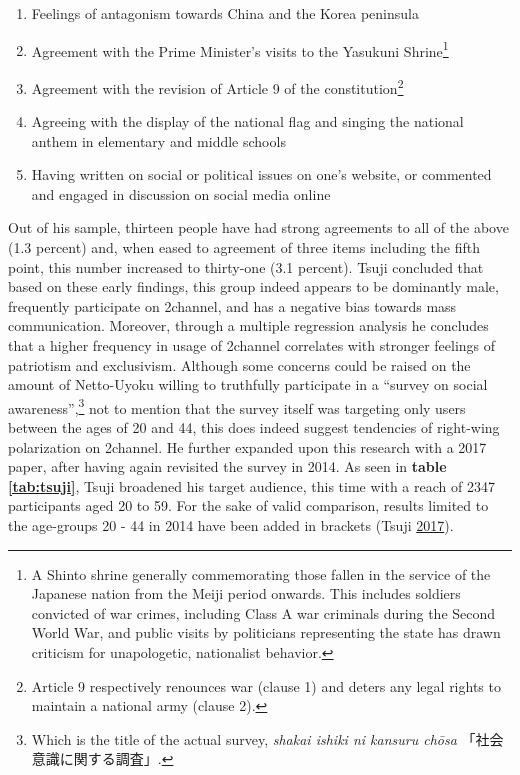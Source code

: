 \documentclass[10pt,british,A4paper,twoside]{memoir}
\providecommand{\tightlist}{%
  \setlength{\itemsep}{0pt}\setlength{\parskip}{0pt}}
\begin{document}
\begin{enumerate}
\def\labelenumi{\arabic{enumi}.}
\tightlist
\item
  Feelings of antagonism towards China and the Korea peninsula
\item
  Agreement with the Prime Minister's visits to the Yasukuni
  Shrine\footnote{A Shinto shrine generally commemorating those fallen
    in the service of the Japanese nation from the Meiji period onwards.
    This includes soldiers convicted of war crimes, including Class A
    war criminals during the Second World War, and public visits by
    politicians representing the state has drawn criticism for
    unapologetic, nationalist behavior.}
\item
  Agreement with the revision of Article 9 of the constitution\footnote{Article
    9 respectively renounces war (clause 1) and deters any legal rights
    to maintain a national army (clause 2).}
\item
  Agreeing with the display of the national flag and singing the
  national anthem in elementary and middle schools
\item
  Having written on social or political issues on one's website, or
  commented and engaged in discussion on social media online
\end{enumerate}

Out of his sample, thirteen people have had strong agreements to all of
the above (1.3 percent) and, when eased to agreement of three items
including the fifth point, this number increased to thirty-one (3.1
percent). Tsuji concluded that based on these early findings, this group
indeed appears to be dominantly male, frequently participate on
2channel, and has a negative bias towards mass communication. Moreover,
through a multiple regression analysis he concludes that a higher
frequency in usage of 2channel correlates with stronger feelings of
patriotism and exclusivism. Although some concerns could be raised on
the amount of Netto-Uyoku willing to truthfully participate in a
``survey on social awareness'',\footnote{Which is the title of the
  actual survey, \emph{shakai ishiki ni kansuru chōsa}
  「社会意識に関する調査」.} not to mention that the survey itself was
targeting only users between the ages of 20 and 44, this does indeed
suggest tendencies of right-wing polarization on 2channel. He further
expanded upon this research with a 2017 paper, after having again
revisited the survey in 2014. As seen in \textbf{table \ref{tab:tsuji}},
Tsuji broadened his target audience, this time with a reach of 2347
participants aged 20 to 59. For the sake of valid comparison, results
limited to the age-groups 20 - 44 in 2014 have been added in brackets
(Tsuji \protect\hyperlink{ref-tsuji_eng._2017}{2017}).
\end{document}
